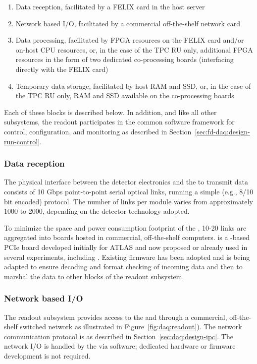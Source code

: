 \begin{enumerate}
\item Data reception, facilitated by a FELIX card in the host server
\item Network based I/O, facilitated by a commercial off-the-shelf network card
\item Data processing, facilitated by FPGA resources on the FELIX
  card and/or on-host CPU resources, or, in the case of the TPC RU only,
  additional FPGA resources in the form of two dedicated co-processing
  boards (interfacing directly with the FELIX card)
\item Temporary data storage, facilitated by host RAM and SSD, or, in
  the case of the TPC RU only, RAM
  and SSD available on the co-processing boards
\end{enumerate}

Each of these blocks is described below.  In addition, and like all other  subsystems, the readout participates in the common software framework for control, configuration, and monitoring as described in Section~\ref{sec:fd-daq:design-run-control}.

\subsubsection{Data reception}

The physical interface between the detector electronics and the  to transmit data consists of 10 Gbps point-to-point serial optical links, running a simple (e.g., 8/10 bit encoded) protocol. 
The number of links per  module varies from approximately 1000 to 2000, depending on the detector technology adopted.

To minimize the space and power consumption footprint of the , 10-20 links are aggregated into  boards hosted in commercial, off-the-shelf computers.
 is a -based PCIe board developed initially for ATLAS and now proposed or already used in several experiments, including . 
Existing firmware has been adopted and is being adapted to ensure
decoding and format checking of incoming data and then to marshal the
data to other blocks of the readout subsystem.

\subsubsection{Network based I/O}

The readout subsystem provides access to the  and  through a commercial, off-the-shelf switched network as illustrated in Figure~\ref{fig:daq:readout}).
The network communication protocol is as described in Section~\ref{sec:daq:design-ipc}.
The network I/O is handled by the  via software; dedicated hardware or firmware development is not required.

